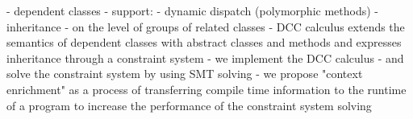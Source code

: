 - dependent classes
  - support:
  - dynamic dispatch (polymorphic methods)
  - inheritance
  - on the level of groups of related classes
- DCC calculus extends the semantics of dependent classes with abstract classes and methods
  and expresses inheritance through a constraint system
- we implement the DCC calculus
- and solve the constraint system by using SMT solving
- we propose "context enrichment" as a process
  of transferring compile time information to the runtime of a program
  to increase the performance of the constraint system solving

